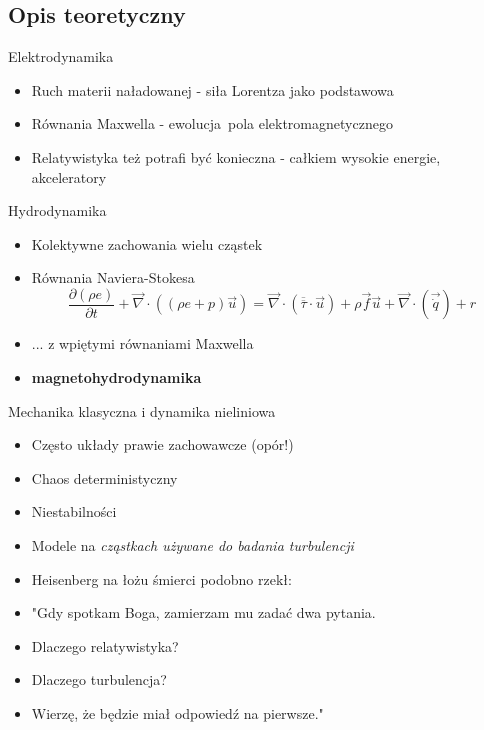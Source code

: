 \documentclass{beamer}
\begin{document}
\subsection{Opis teoretyczny}

\begin{frame}[t]{Elektrodynamika}
  \begin{itemize}[<+->]
    \item Ruch materii naładowanej - siła Lorentza jako podstawowa
    \item Równania Maxwella - ewolucja pola elektromagnetycznego
    \item Relatywistyka też potrafi być konieczna - całkiem wysokie energie, akceleratory
  \end{itemize}
\end{frame}

\begin{frame}[t]{Hydrodynamika}
  \begin{itemize}[<+->]
    \item Kolektywne zachowania wielu cząstek
    \item Równania Naviera-Stokesa
      \begin{equation}
      \frac{\partial(\rho e)}{\partial t} + \overrightarrow{\nabla}\cdot((\rho e + p)\overrightarrow{u}) = \overrightarrow{\nabla}\cdot(\overline{\overline{\tau}}\cdot\overrightarrow{u}) + \rho\overrightarrow{f}\overrightarrow{u} + \overrightarrow{\nabla}\cdot(\overrightarrow{\dot{q}})+r \end{equation}

    \item ... z wpiętymi równaniami Maxwella
    \item \textbf{magnetohydrodynamika}
  \end{itemize}

\end{frame}

\begin{frame}[t]{Mechanika klasyczna i dynamika nieliniowa}
  \begin{itemize}[<+->]
    \item Często układy prawie zachowawcze (opór!)
    \item Chaos deterministyczny
    \item Niestabilności
    \item Modele na \em{cząstkach} używane do badania \em{turbulencji}
    \item Heisenberg na łożu śmierci podobno rzekł:
    \item "Gdy spotkam Boga, zamierzam mu zadać dwa pytania.
    \item Dlaczego relatywistyka?
    \item Dlaczego turbulencja?
    \item Wierzę, że będzie miał odpowiedź na pierwsze."
  \end{itemize}
\end{frame}
\end{document}
